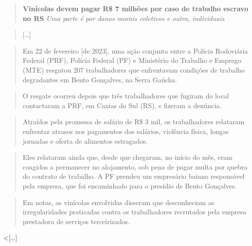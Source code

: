 \begin{quote}
\textbf{Vinícolas devem pagar R\$ 7 milhões por caso de trabalho escravo no RS}
\emph{Uma parte é por danos morais coletivos e outra, individuais}
\end{quote}

\begin{quote}
{[}\ldots{}{]}
\end{quote}

\begin{quote}
Em 22 de fevereiro {[}de 2023{]}, uma ação conjunta entre a Polícia
Rodoviária Federal (PRF), Polícia Federal (PF) e Ministério do Trabalho
e Emprego (MTE) resgatou 207 trabalhadores que enfrentavam condições de
trabalho degradantes em Bento Gonçalves, na Serra Gaúcha.
\end{quote}

\begin{quote}
O resgate ocorreu depois que três trabalhadores que fugiram do local
contactaram a PRF, em Caxias do Sul (RS), e fizeram a denúncia.
\end{quote}

\begin{quote}
Atraídos pela promessa de salário de R\$ 3 mil, os trabalhadores
relataram enfrentar atrasos nos pagamentos dos salários, violência
física, longas jornadas e oferta de alimentos estragados.
\end{quote}

\begin{quote}
Eles relataram ainda que, desde que chegaram, no início do mês, eram
coagidos a permanecer no alojamento, sob pena de pagar multa por quebra
do contrato de trabalho. A PF prendeu um empresário baiano responsável
pela empresa, que foi encaminhado para o presídio de Bento Gonçalves.
\end{quote}

\begin{quote}
Em notas, as vinícolas envolvidas disseram que desconheciam as
irregularidades praticadas contra os trabalhadores recrutados pela
empresa prestadora de serviços terceirizados.
\end{quote}

\textless{}{[}\ldots{}{]}


